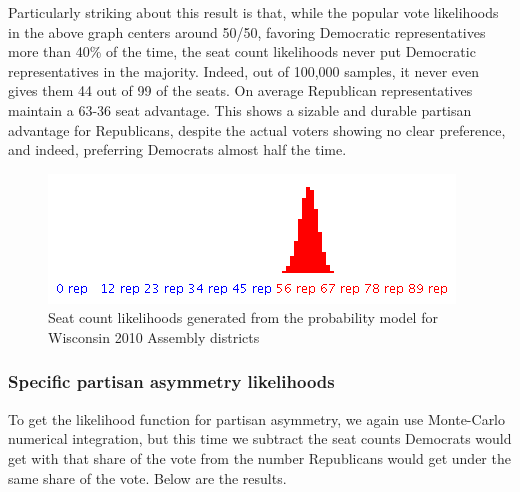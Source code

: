 \documentclass[preprint,12pt]{article}
\begin{document}
Particularly striking about this result is that, while the popular vote likelihoods in the above graph centers around 50/50, favoring Democratic representatives more than 40\% of the time, the seat count likelihoods never put Democratic representatives in the majority.  Indeed, out of 100,000 samples, it never even gives them 44 out of 99 of the seats.  On average Republican representatives maintain a 63-36 seat advantage.   This shows a sizable and durable partisan advantage for Republicans, despite the actual voters showing no clear preference, and indeed, preferring Democrats almost half the time.

\begin{figure}[htb!]
    \begin{center}
        \includegraphics[scale=0.6]{../Figures/WI2010/seat_count_likelihoods.png}
        \caption{Seat count likelihoods generated from the probability model for Wisconsin 2010 Assembly districts}\label{fig:LikelihoodsSeatCounts}
    \end{center}
\end{figure}
 

\subsubsection{Specific partisan asymmetry likelihoods}
 
To get the likelihood function for partisan asymmetry, we again use Monte-Carlo numerical integration, but this time we subtract the seat counts Democrats would get with that share of the vote from the number Republicans would get under the same share of the vote.  Below are the results.
 
\end{document}
